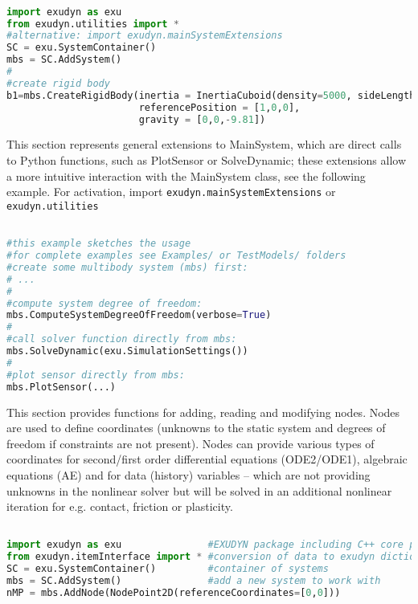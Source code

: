\pythonstyle
\begin{lstlisting}[language=Python, firstnumber=1]

import exudyn as exu           
from exudyn.utilities import * 
#alternative: import exudyn.mainSystemExtensions
SC = exu.SystemContainer()
mbs = SC.AddSystem()
#
#create rigid body
b1=mbs.CreateRigidBody(inertia = InertiaCuboid(density=5000, sideLengths=[0.1,0.1,1]),
                       referencePosition = [1,0,0], 
                       gravity = [0,0,-9.81])
\end{lstlisting}




\label{sec:mainsystem:pythonExtensions}
This section represents general extensions to MainSystem, which are direct calls to Python functions, such as PlotSensor or SolveDynamic; these extensions allow a more intuitive interaction with the MainSystem class, see the following example. For activation, import \texttt{exudyn.mainSystemExtensions} or \texttt{exudyn.utilities}

\pythonstyle
\begin{lstlisting}[language=Python, firstnumber=1]

#this example sketches the usage 
#for complete examples see Examples/ or TestModels/ folders
#create some multibody system (mbs) first:
# ... 
#
#compute system degree of freedom: 
mbs.ComputeSystemDegreeOfFreedom(verbose=True)
#
#call solver function directly from mbs:
mbs.SolveDynamic(exu.SimulationSettings())
#
#plot sensor directly from mbs:
mbs.PlotSensor(...)
\end{lstlisting}




\label{sec:mainsystem:node}



This section provides functions for adding, reading and modifying nodes. Nodes are used to define coordinates (unknowns to the static system and degrees of freedom if constraints are not present). Nodes can provide various types of coordinates for second/first order differential equations (ODE2/ODE1), algebraic equations (AE) and for data (history) variables -- which are not providing unknowns in the nonlinear solver but will be solved in an additional nonlinear iteration for e.g. contact, friction or plasticity.
\pythonstyle
\begin{lstlisting}[language=Python, firstnumber=1]

import exudyn as exu               #EXUDYN package including C++ core part
from exudyn.itemInterface import * #conversion of data to exudyn dictionaries
SC = exu.SystemContainer()         #container of systems
mbs = SC.AddSystem()               #add a new system to work with
nMP = mbs.AddNode(NodePoint2D(referenceCoordinates=[0,0]))
\end{lstlisting}

